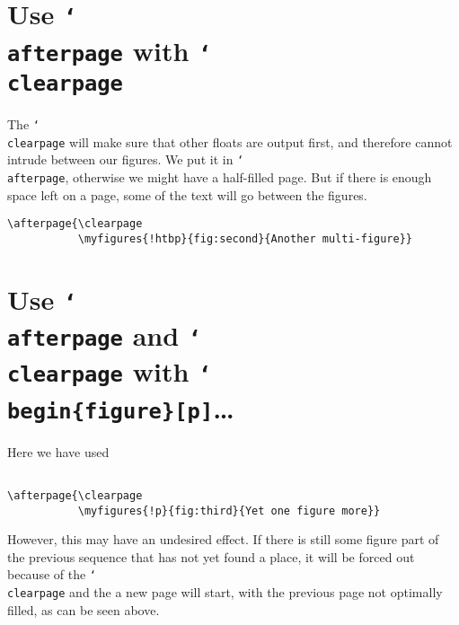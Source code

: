 \documentclass{article}
\newcommand{\cs}[1]{\texttt{\char`\\#1}}
\begin{document}
\medskip


\lipsum[1-2]

\section{Use \cs{afterpage} with \cs{clearpage}}

\begin{boxedminipage}{\textwidth}
The \cs{clearpage} will make sure that other floats  are output first, and therefore cannot intrude between our figures.
We put it in \cs{afterpage}, otherwise we might have a half-filled page.
But if there is enough space left on a page, some of the text will go between the figures.

\begin{verbatim}
\afterpage{\clearpage
           \myfigures{!htbp}{fig:second}{Another multi-figure}}

\end{verbatim}
\end{boxedminipage}
\medskip


\lipsum[1]

\section{Use  \cs{afterpage} and \cs{clearpage} with  \cs{begin}\texttt{\{figure\}[p]}\ldots}


\medskip

\begin{boxedminipage}{\textwidth}
Here we have used
\begin{verbatim}

\afterpage{\clearpage
           \myfigures{!p}{fig:third}{Yet one figure more}}

\end{verbatim}
However, this may have an undesired effect.
If there is still some figure part of the previous sequence that has not yet found a place, it will be forced out because of the \cs{clearpage} and the a new page will start, with the previous page not optimally filled, as can be seen above.
\end{boxedminipage}
\end{document}
